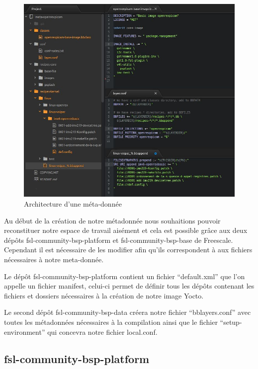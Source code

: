 \begin{figure}[!htb]
    \centering
    \includegraphics[trim={0cm 0cm 0cm 0cm},clip,scale=0.31]{Figures/architecture.png}
    \decoRule
    \caption{Architecture d'une méta-donnée} \label{fig:architecture}
\end{figure} 

Au début de la création de notre métadonnée nous souhaitions pouvoir reconstituer notre
espace de travail aisément et cela est possible grâce aux deux dépôts
fsl-community-bsp-platform et fsl-community-bsp-base de Freescale. Cependant il est
nécessaire de les modifier afin qu’ils correspondent à aux fichiers nécessaires à notre
meta-donnée. \medskip 

Le dépôt fsl-community-bsp-platform contient un fichier “default.xml” que l’on appelle un
fichier manifest, celui-ci permet de définir tous les dépôts contenant les fichiers et dossiers
nécessaires à la création de notre image Yocto. \medskip 

Le second dépôt fsl-community-bsp-data créera notre fichier “bblayers.conf”
avec toutes les métadonnées nécessaires à la compilation ainsi que le fichier
“setup-environment” qui concevra notre fichier local.conf.

\subsection{fsl-community-bsp-platform}

